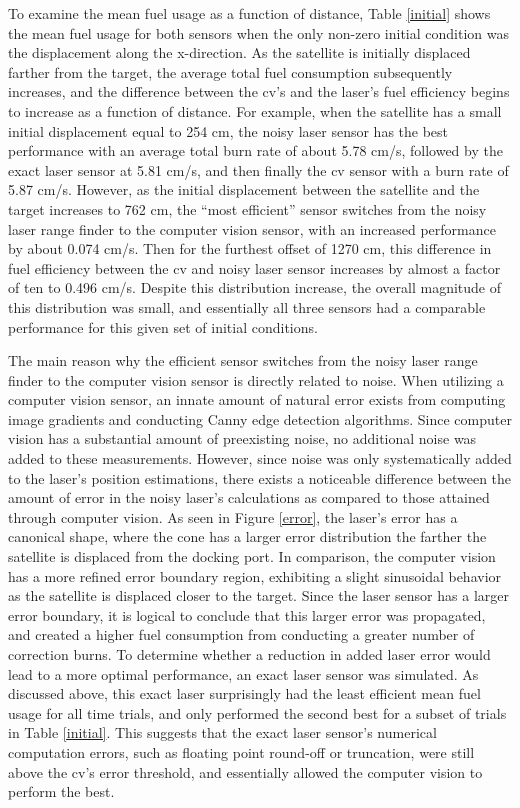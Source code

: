 \documentclass[journal, 10pt]{IEEEtran}
\begin{document}
To examine the mean fuel usage as a function of distance, Table \ref{initial} shows the mean fuel usage for both sensors when the only non-zero initial condition was the displacement along the x-direction. As the satellite is initially displaced farther from the target, the average total fuel consumption subsequently increases, and the difference between the cv's and the laser's fuel efficiency begins to increase as a function of distance. For example, when the satellite has a small initial displacement equal to 254 cm, the noisy laser sensor has the best performance with an average total burn rate of about 5.78 cm/s, followed by the exact laser sensor at 5.81 cm/s, and then finally the cv sensor with a burn rate of 5.87 cm/s. However, as the initial displacement between the satellite and the target increases to 762 cm, the ``most efficient'' sensor switches from the noisy laser range finder to the computer vision sensor, with an increased performance by about 0.074 cm/s. Then for the furthest offset of 1270 cm, this difference in fuel efficiency between the cv and noisy laser sensor increases by almost a factor of ten to 0.496 cm/s. Despite this distribution increase, the overall magnitude of this distribution was small, and essentially all three sensors had a comparable performance for this given set of initial conditions. 

The main reason why the efficient sensor switches from the noisy laser range finder to the computer vision sensor is directly related to noise. When utilizing a computer vision sensor, an innate amount of natural error exists from computing image gradients and conducting Canny edge detection algorithms. Since computer vision has a substantial amount of preexisting noise, no additional noise was added to these measurements. However, since noise was only systematically added to the laser's position estimations, there exists a noticeable difference between the amount of error in the noisy laser's calculations as compared to those attained through computer vision. As seen in Figure \ref{error}, the laser's error has a canonical shape, where the cone has a larger error distribution the farther the satellite is displaced from the docking port. In comparison, the computer vision has a more refined error boundary region, exhibiting a slight sinusoidal behavior as the satellite is displaced closer to the target. Since the laser sensor has a larger error boundary, it is logical to conclude that this larger error was propagated, and created a higher fuel consumption from conducting a greater number of correction burns. To determine whether a reduction in added laser error would lead to a more optimal performance, an exact laser sensor was simulated. As discussed above, this exact laser surprisingly had the least efficient mean fuel usage for all time trials, and only performed the second best for a subset of trials in Table \ref{initial}. This suggests that the exact laser sensor's numerical computation errors, such as floating point round-off or truncation, were still above the cv's error threshold, and essentially allowed the computer vision to perform the best.
\end{document}

